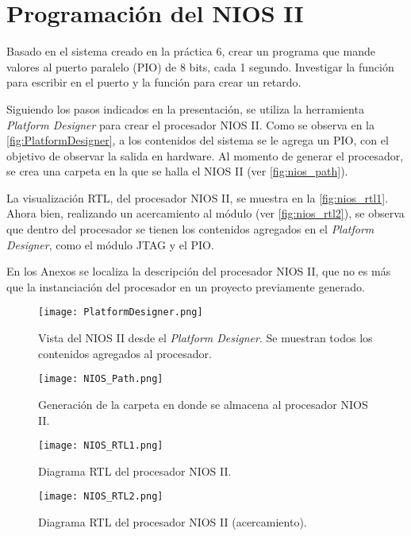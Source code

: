 \section{Programación del NIOS II \label{sec:s1}}

\begin{center}
	\begin{minipage}{12cm}
		\begin{tcolorbox}[title=Actividad 1]
			Basado en el sistema creado en la práctica 6, crear un programa que mande valores al puerto paralelo (PIO) de 8 bits, cada 1 segundo. Investigar la función para escribir en el puerto y la función para crear un retardo.
		\end{tcolorbox}	
	\end{minipage}
\end{center}



Siguiendo los pasos indicados en la presentación, se utiliza la herramienta \textit{Platform Designer} para crear el procesador NIOS II. Como se observa en la \autoref{fig:PlatformDesigner}, a los contenidos del sistema se le agrega un PIO, con el objetivo de observar la salida en hardware. Al momento de generar el procesador, se crea una carpeta en la que se halla el NIOS II (ver \autoref{fig:nios_path}).

La visualización RTL, del procesador NIOS II, se muestra en la \autoref{fig:nios_rtl1}. Ahora bien, realizando un acercamiento al módulo (ver \autoref{fig:nios_rtl2}), se observa que dentro del procesador se tienen los contenidos agregados en el \textit{Platform Designer}, como el módulo JTAG y el PIO.

En los Anexos se localiza la descripción del procesador NIOS II, que no es más que la instanciación del procesador en un proyecto previamente generado. 

\begin{figure}[ht]
	\centering
	\texttt{[image: PlatformDesigner.png]}
	\caption{Vista del NIOS II desde el \textit{Platform Designer}. Se muestran todos los contenidos agregados al procesador. \label{fig:PlatformDesigner}}
\end{figure}

\begin{figure}[ht]
	\centering
	\texttt{[image: NIOS\_Path.png]}
	\caption{Generación de la carpeta en donde se almacena al procesador NIOS II. \label{fig:nios_path}}
\end{figure}

\begin{figure}[ht]
	\centering
	\texttt{[image: NIOS\_RTL1.png]}
	\caption{Diagrama RTL del procesador NIOS II. \label{fig:nios_rtl1}}
\end{figure}

\begin{figure}[ht]
	\centering
	\texttt{[image: NIOS\_RTL2.png]}
	\caption{Diagrama RTL del procesador NIOS II (acercamiento). \label{fig:nios_rtl2}}
\end{figure}